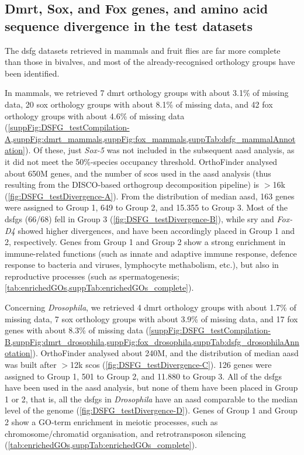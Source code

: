 \subsection{Dmrt, Sox, and Fox genes, and amino acid sequence divergence in the test datasets} \label{subSect:dsfgTestDataset}
The \gls{dsfg} datasets retrieved in mammals and fruit flies are far more complete than those in bivalves, and most of the already-recognised orthology groups have been identified.

In mammals, we retrieved 7 \gls{dmrt} orthology groups with about 3.1\% of missing data, 20 \gls{sox} orthology groups with about 8.1\% of missing data, and 42 \gls{fox} orthology groups with about 4.6\% of missing data (\cref{suppFig:DSFG_testCompilation-A,suppFig:dmrt_mammals,suppFig:fox_mammals,suppTab:dsfg_mammalAnnotation}). Of these, just \textit{Sox-5} was not included in the subsequent \gls{aasd} analysis, as it did not meet the 50\%-species occupancy threshold. OrthoFinder analysed about 650M genes, and the number of \glspl{sco} used in the \gls{aasd} analysis (thus resulting from the DISCO-based orthogroup decomposition pipeline) is $>$16k (\cref{fig:DSFG_testDivergence-A}). From the distribution of median \gls{aasd}, 163 genes were assigned to Group 1, 649 to Group 2, and 15.355 to Group 3. Most of the \glspl{dsfg} (66/68) fell in Group 3 (\cref{fig:DSFG_testDivergence-B}), while \gls{sry} and \textit{Fox-D4} showed higher divergences, and have been accordingly placed in Group 1 and 2, respectively. Genes from Group 1 and Group 2 show a strong enrichment in immune-related functions (such as innate and adaptive immune response, defence response to bacteria and viruses, lymphocyte methabolism, etc.), but also in reproductive processes (such as spermatogenesis; \cref{tab:enrichedGOs,suppTab:enrichedGOs_complete}).

Concerning \textit{Drosophila}, we retrieved 4 \gls{dmrt} orthology groups with about 1.7\% of missing data, 7 \gls{sox} orthology groups with about 3.9\% of missing data, and 17 \gls{fox} genes with about 8.3\% of missing data (\cref{suppFig:DSFG_testCompilation-B,suppFig:dmrt_drosophila,suppFig:fox_drosophila,suppTab:dsfg_drosophilaAnnotation}). OrthoFinder analysed about 240M, and the distribution of median \gls{aasd} was built after $>$12k \glspl{sco} (\cref{fig:DSFG_testDivergence-C}). 126 genes were assigned to Group 1, 501 to Group 2, and 11.880 to Group 3. All of the \glspl{dsfg} have been used in the \gls{aasd} analysis, but none of them have been placed in Group 1 or 2, that is, all the \glspl{dsfg} in \textit{Drosophila} have an \gls{aasd} comparable to the median level of the genome (\cref{fig:DSFG_testDivergence-D}). Genes of Group 1 and Group 2 show a GO-term enrichment in meiotic processes, such as chromosome/chromatid organisation, and retrotransposon silencing (\cref{tab:enrichedGOs,suppTab:enrichedGOs_complete}).

